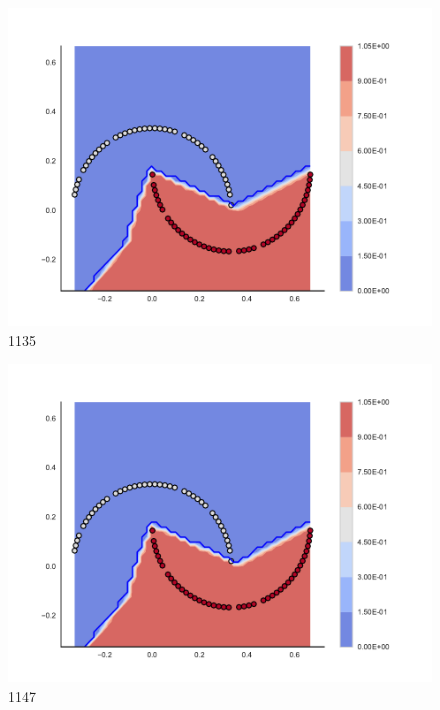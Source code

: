\begin{subfigure}[b]{0.09\textwidth}
    \includegraphics[clip, trim=2.35cm 1.75cm 4.5cm 0cm,width=\textwidth]{img/convergence/1135.pdf}
    \caption{1135}
    \label{fig:convergence_1135}
\end{subfigure}
%
\begin{subfigure}[b]{0.09\textwidth}
    \includegraphics[clip, trim=2.35cm 1.75cm 4.5cm 0cm,width=\textwidth]{img/convergence/1147.pdf}
    \caption{1147}
    \label{fig:convergence_1147}
\end{subfigure}
%
